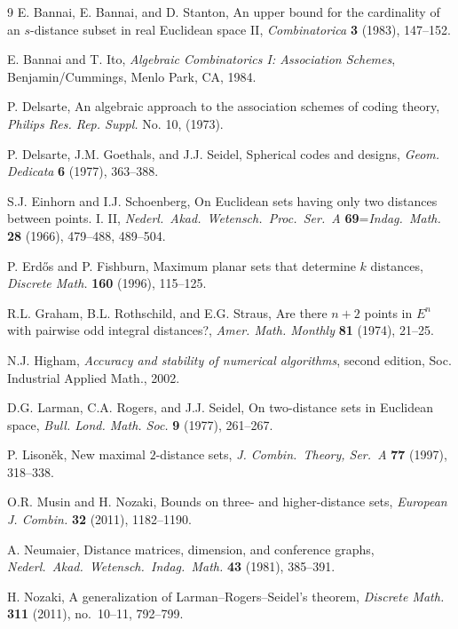 \documentclass[a4paper, 11pt]{article}
\theoremstyle{definition}
\begin{document}
\begin{thebibliography}{9}
E. Bannai, E. Bannai, and D. Stanton, 
An upper bound for the cardinality of an $s$-distance subset in real Euclidean space II,  {\it Combinatorica} {\bf 3} (1983), 147--152.

E. Bannai and T. Ito, 
{\it Algebraic Combinatorics I: Association Schemes}, 
Benjamin/Cummings, Menlo Park, CA, 1984.

P. Delsarte, 
An algebraic approach to the association schemes of
coding theory, 
{\it Philips Res. Rep. Suppl.} No. 10, (1973).

P. Delsarte, J.M. Goethals, and J.J. Seidel, 
Spherical codes and designs,
{\it Geom. Dedicata} {\bf 6} (1977), 363--388.

S.J. Einhorn and I.J. Schoenberg,
On Euclidean sets having only two distances between points. I. II,
{\it Nederl.\ Akad.\ Wetensch.\ Proc.\ Ser.\ A} {\bf 69}={\it Indag.\ Math.} {\bf 28} (1966), 
479--488, 489--504.


 P. Erd\H{o}s and P. Fishburn, Maximum planar sets that determine $k$ distances, 
{\it Discrete Math.} {\bf 160} (1996), 115--125.

R.L. Graham, B.L. Rothschild, and E.G. Straus, 
Are there $n+2$ points in $E^n$ with pairwise odd integral distances?,
{\it Amer. Math. Monthly} {\bf 81} (1974), 21--25.

N.J. Higham, 
{\it Accuracy and stability of numerical algorithms}, second edition, Soc. Industrial Applied Math., 2002.


D.G. Larman, C.A. Rogers, and J.J. Seidel, 
On two-distance sets in Euclidean space, 
{\it Bull. Lond. Math. Soc.} {\bf 9} (1977), 261--267.

P. Lison\v{e}k, 
New maximal $2$-distance sets, 
\textit{J. Combin.\ Theory, Ser.\ A} {\bf 77} (1997), 318--338.


O.R. Musin and H. Nozaki, 
Bounds on three- and higher-distance sets,
{\it European J. Combin.} {\bf 32} (2011), 1182--1190.

A. Neumaier, 
Distance matrices, dimension, and conference graphs, 
{\it Nederl.\ Akad.\ Wetensch.\ Indag.\ Math.} {\bf 43} (1981), 385--391.

H. Nozaki, 
A generalization of Larman--Rogers--Seidel's theorem, 
{\it Discrete Math.} {\bf 311} (2011), no.\ 10--11, 792--799. 


\end{thebibliography}
\end{document}
